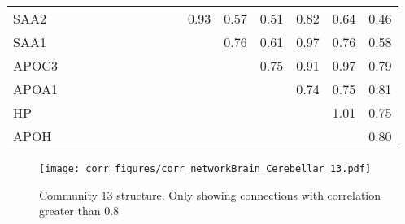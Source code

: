 \begin{longtable}{lrrrrrrrrrrrrrrr}
SAA2  &             &            &           &           &           &           &            &            &            &       0.93 &        0.57 &        0.51 &     0.82 &       0.64 &       0.46 \\
SAA1  &             &            &           &           &           &           &            &            &            &            &        0.76 &        0.61 &     0.97 &       0.76 &       0.58 \\
APOC3 &             &            &           &           &           &           &            &            &            &            &             &        0.75 &     0.91 &       0.97 &       0.79 \\
APOA1 &             &            &           &           &           &           &            &            &            &            &             &             &     0.74 &       0.75 &       0.81 \\
HP    &             &            &           &           &           &           &            &            &            &            &             &             &          &       1.01 &       0.75 \\
APOH  &             &            &           &           &           &           &            &            &            &            &             &             &          &            &       0.80 \\
\end{longtable}


\begin{figure}[h!]
\centering
\texttt{[image: corr\_figures/corr\_networkBrain\_Cerebellar\_13.pdf]}
\caption{Community 13 structure. Only showing connections with correlation greater than 0.8}
\end{figure}




